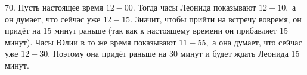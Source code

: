 70. Пусть настоящее время $12-00.$ Тогда часы Леонида показывают $12-10,$ а он думает, что сейчас уже $12-15.$ Значит, чтобы прийти на встречу вовремя, он придёт на 15 минут раньше (так как к настоящему времени он прибавляет 15 минут). Часы Юлии в то же время показывают $11-55,$ а она думает, что сейчас уже $12-30.$ Поэтому она придёт раньше на 30 минут и будет ждать Леонида 15 минут.\\
